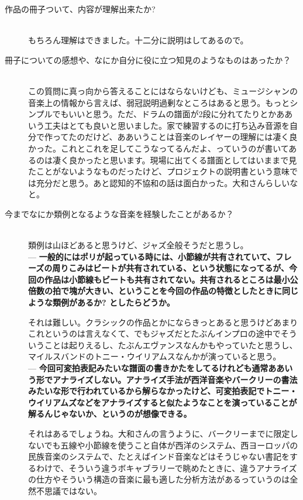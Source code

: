 \documentclass[uplatex,dvipdfmx]{ujarticle}
\begin{document}
\begin{description}
\item [作品の冊子ついて、内容が理解出来たか?]\mbox{}\\

もちろん理解はできました。十二分に説明はしてあるので。\\

\item [冊子についての感想や、なにか自分に役に立つ知見のようなものはあったか？]\mbox{}\\

この質問に真っ向から答えることにはならないけども、ミュージシャンの音楽上の情報から言えば、弱冠説明過剰なところはあると思う。もっとシンプルでもいいと思う。ただ、ドラムの譜面が2段に分れてたりとかああいう工夫はとても良いと思いました。家で練習するのに打ち込み音源を自分で作ってたのだけど、ああいうことは音楽のレイヤーの理解には凄く良かった。これとこれを足してこうなってるんだよ、っていうのが書いてあるのは凄く良かったと思います。現場に出てくる譜面としてはいままで見たことがないようなものだったけど、プロジェクトの説明書という意味では充分だと思う。あと認知的不協和の話は面白かった。大和さんらしいなと。\\

\item [今までなにか類例となるような音楽を経験したことがあるか？]\mbox{}\\

類例は山ほどあると思うけど、ジャズ全般そうだと思うし。\\

--- {\bf 一般的にはポリが起っている時には、小節線が共有されていて、フレーズの周りこみはビートが共有されている、という状態になってるが、今回の作品は小節線もビートも共有されてない。共有されるところは最小公倍数の拍で塊が大きい、ということを今回の作品の特徴としたときに同じような類例があるか? としたらどうか。}

それは難しい。クラシックの作品とかにならきっとあると思うけどあまりこれというのは言えなくて、でもジャズだとたぶんインプロの途中でそういうことは起りえるし、たぶんエヴァンスなんかもやっていたと思うし、マイルスバンドのトニー・ウイリアムスなんかが演っていると思う。\\

--- {\bf 今回可変拍表記みたいな譜面の書きかたをしてるけれども通常ああいう形でアナライズしない。アナライズ手法が西洋音楽やバークリーの書法みたいな形で行われているから解らなかったけど、可変拍表記でトニー・ウイリアムズなどをアナライズすると似たようなことを演っていることが解るんじゃないか、というのが想像できる。}

それはあるでしょうね。大和さんの言うように、バークリーまでに限定しないでも五線や小節線を使うこと自体が西洋のシステム、西ヨーロッパの民族音楽のシステムで、たとえばインド音楽などはそうじゃない書記をするわけで、そういう違うボキャブラリーで眺めたときに、違うアナライズの仕方やそういう構造の音楽に最も適した分析方法があるっていうのは全然不思議ではない。\\


\end{description}
\end{document}
